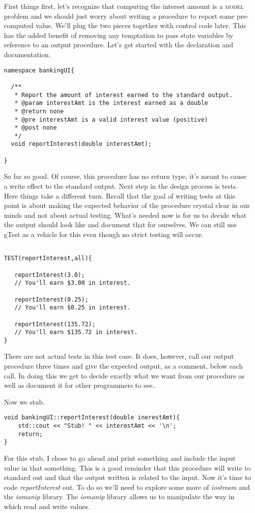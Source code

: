 First things first, let's recognize that computing the interest amount is a \textsc{model} problem and we should just worry about writing a procedure to report some pre-computed value. We'll plug the two pieces together with control code later. This has the added benefit of removing any temptation to pass state variables by reference to an output procedure. Let's get started with the declaration and documentation.
\begin{verbatim}
namespace bankingUI{

  /**
   * Report the amount of interest earned to the standard output.
   * @param interestAmt is the interest earned as a double
   * @return none
   * @pre interestAmt is a valid interest value (positive)
   * @post none
   */
  void reportInterest(double interestAmt);
 
}
\end{verbatim}  

So far so good. Of course, this procedure has no return type, it's meant to  cause a write effect to the standard output. Next step in the design process is tests. Here things take a different turn.  Recall that the goal of writing tests at this point is about making the expected behavior of the procedure crystal clear in our minds and not about actual testing. What's needed now is for us to decide what the output should look like and document that for ourselves. We can still use gTest as a vehicle for this even though no strict testing will occur.

\begin{verbatim}

TEST(reportInterest,all){

   reportInterest(3.0);
   // You'll earn $3.00 in interest.
   
   reportInterest(0.25);
   // You'll earn $0.25 in interest.
   
   reportInterest(135.72);
   // You'll earn $135.72 in interest.
}

\end{verbatim}
There are not actual tests in this test case. It does, however, call our output procedure three times and give the expected output, as a comment, below each call. In doing this we get to decide exactly what we want from our procedure as well as document it for other programmers to see..

Now we stub. 
\begin{verbatim}
void bankingUI::reportInterest(double inerestAmt){
	std::cout << "Stub! " << interestAmt << '\n';	
	return;
}
\end{verbatim}
For this stub, I chose to go ahead and print something and include the input value in that something. This is a good reminder that this procedure will write to standard out and that the output written is related to the input. Now it's time to code \textit{reportInterest} out. To do so we'll need to explore some more of \textit{iostream} and the \textit{iomanip} library. The \textit{iomanip} library allows us to manipulate the way in which read and write values. 

